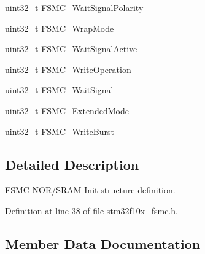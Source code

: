 \begin{DoxyCompactItemize}
\item 
\hyperlink{_p_e___types_8h_a33594304e786b158f3fb30289278f5af}{uint32\+\_\+t} \hyperlink{struct_f_s_m_c___n_o_r_s_r_a_m_init_type_def_a5d4d76594fc201943b51095e3ef34791}{F\+S\+M\+C\+\_\+\+Wait\+Signal\+Polarity}
\item 
\hyperlink{_p_e___types_8h_a33594304e786b158f3fb30289278f5af}{uint32\+\_\+t} \hyperlink{struct_f_s_m_c___n_o_r_s_r_a_m_init_type_def_a7e201c17bf7c5f6cc69fb6de29c8b024}{F\+S\+M\+C\+\_\+\+Wrap\+Mode}
\item 
\hyperlink{_p_e___types_8h_a33594304e786b158f3fb30289278f5af}{uint32\+\_\+t} \hyperlink{struct_f_s_m_c___n_o_r_s_r_a_m_init_type_def_a71c6e7cc8e7e1a8fd0562960ffd23e88}{F\+S\+M\+C\+\_\+\+Wait\+Signal\+Active}
\item 
\hyperlink{_p_e___types_8h_a33594304e786b158f3fb30289278f5af}{uint32\+\_\+t} \hyperlink{struct_f_s_m_c___n_o_r_s_r_a_m_init_type_def_a596793d1735c4e38c87e3bf91d986370}{F\+S\+M\+C\+\_\+\+Write\+Operation}
\item 
\hyperlink{_p_e___types_8h_a33594304e786b158f3fb30289278f5af}{uint32\+\_\+t} \hyperlink{struct_f_s_m_c___n_o_r_s_r_a_m_init_type_def_aedbc7df3ff61cc93a910a64dc53c932b}{F\+S\+M\+C\+\_\+\+Wait\+Signal}
\item 
\hyperlink{_p_e___types_8h_a33594304e786b158f3fb30289278f5af}{uint32\+\_\+t} \hyperlink{struct_f_s_m_c___n_o_r_s_r_a_m_init_type_def_af33d0076b5bfea3a66e388ed7f3eb3f3}{F\+S\+M\+C\+\_\+\+Extended\+Mode}
\item 
\hyperlink{_p_e___types_8h_a33594304e786b158f3fb30289278f5af}{uint32\+\_\+t} \hyperlink{struct_f_s_m_c___n_o_r_s_r_a_m_init_type_def_adac3756711f2d76e56a8cbcb7a03843d}{F\+S\+M\+C\+\_\+\+Write\+Burst}
\end{DoxyCompactItemize}


\subsection{Detailed Description}
F\+S\+MC N\+O\+R/\+S\+R\+AM Init structure definition. 

Definition at line 38 of file stm32f10x\+\_\+fsmc.\+h.



\subsection{Member Data Documentation}
